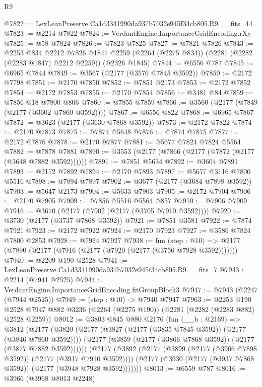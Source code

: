 \begin{lexlean}{R9}
\begin{coremodule}
@7822 := LexLeanPreserve.Ca1d3341990da937b7032e945f34cb805.R9.__fits_44
@7823 := @2214 @7822
@7824 := VerdantEngine.ImportanceGridEncoding.rXy
@7825 := @58 @7824
@7826 := @7823 @7825
@7827 := @7821 @7826
@7843 := @2253
    @834
    @2212
    @7826
    @1847
    @2259
    (@2264 (@2275 @834))
    (@2281 (@2282 (@2283 @1847) @2212 @2259))
    (@2326 @1845)
@7844 := @6556 @787
@7845 := @6965 @7844
@7849 := @3567 (@2177 (@3576 @7845 @3592))
@7850 := @2172 @7798
@7851 := @2170 @7850
@7852 := @7851 @2173
@7853 := @2172 @7852
@7854 := @2172 @7853
@7855 := @2170 @7854
@7856 := @3481 @84
@7859 := @7856 @18 @7800 @806
@7860 := @7855 @7859
@7866 := @3560 (@2177 (@7849 (@2177 (@3602 @7860 @3592))))
@7867 := @6556 @822
@7868 := @6965 @7867
@7872 := @3623 (@2177 (@3630 @7868 @3592))
@7873 := @2172 @7822
@7874 := @2170 @7873
@7875 := @7874 @5648
@7876 := @7874 @7875
@7877 := @2172 @7876
@7878 := @2170 @7877
@7881 := @5677 @7824 @7824 @5564
@7882 := @7878 @7881
@7890 := @3553 (@2177 (@7866 (@2177 (@7872 (@2177 (@3648 @7882 @3592))))))
@7891 := @7851 @5634
@7892 := @3604 @7891
@7893 := @2172 @7892
@7894 := @2170 @7893
@7897 := @5677 @3116 @7800 @5516
@7898 := @7894 @7897
@7902 := @3677 (@2177 (@3684 @7898 @3592))
@7903 := @5647 @2173
@7904 := @5633 @7903
@7905 := @2172 @7904
@7906 := @2170 @7905
@7909 := @7856 @5516 @5564 @857
@7910 := @7906 @7909
@7916 := @3670 (@2177 (@7902 (@2177 (@3705 @7910 @3592))))
@7920 := @3730 (@2177 (@3737 @7868 @3592))
@7921 := @7851 @3581
@7922 := @7874 @7921
@7923 := @2172 @7922
@7924 := @2170 @7923
@7927 := @3586 @7824 @7800 @2853
@7928 := @7924 @7927
@7938 := fun (step : @10) =>
  @2177 (@7890 (@2177 (@7916 (@2177 (@7920 (@2177 (@3756 @7928 @3592)))))))
@7940 := @2209 @190 @2528
@7941 := LexLeanPreserve.Ca1d3341990da937b7032e945f34cb805.R9.__fits_7
@7943 := @2214 (@7941 @2525)
@7944 := VerdantEngine.ImportanceGridEncoding.fitGroupBlock3
@7947 := @7943 (@2247 (@7944 @2525))
@7949 := (step : @10) -> @7940 @7947
@7963 := @2253
    @190
    @2528
    @7947
    @882
    @3236
    (@2264 (@2275 @190))
    (@2281 (@2282 (@2283 @882) @2528 @2259))
@8012 := @3803
    @845
    @880
    @2176
    (fun (__b : @2169) =>
    @3812
      (@2177
        (@3820
          (@2177 (@3827 (@2177 (@3835 @7845 @3592)) (@2177 (@3846 @7860 @3592))))
          (@2177 (@3859 (@2177 (@3866 @7868 @3592)) (@2177 (@3877 @7882 @3592))))))
      (@2177
        (@3892
          (@2177 (@3899 (@2177 (@3906 @7898 @3592)) (@2177 (@3917 @7910 @3592))))
          (@2177 (@3930 (@2177 (@3937 @7868 @3592)) (@2177 (@3948 @7928 @3592)))))))
@8013 := @6559 @787
@8016 := @3966 (@3968 @8013 @2248)

\end{coremodule}
\end{lexlean}
